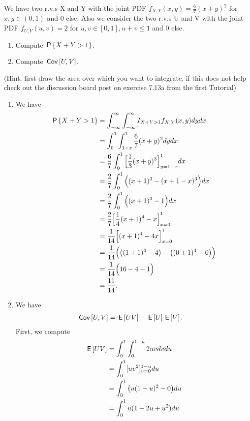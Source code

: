 \documentclass[assignments]{subfiles}
\begin{document}
\begin{exercise}
We have two r.v.s X and Y with the joint PDF $f_{X,Y}(x,y) = \frac{6}{7}(x+y)^2$ for $x, y \in (0,1)$ and 0 else. Also we consider the two r.v.s U and V with the joint PDF $f_{U,V}(u,v) = 2$ for $u, v \in [0,1], u+v \leq 1$ and 0 else.
\begin{enumerate}
\item Compute $\P{X+Y>1}$.
\item Compute $\cov{U,V}$.
\end{enumerate}
(Hint: first draw the area over which you want to integrate, if this does not help check out the discussion board post on exercise 7.13a from the first Tutorial)
\begin{solution}
\begin{enumerate}
    \item We have
    \begin{align}
        \P{X+Y>1} &= \int_{-\infty}^\infty \int_{-\infty}^\infty I_{X + Y > 1} f_{X,Y}(x,y) dy dx \\
        &= \int_{0}^1 \int_{1-x}^1  \frac{6}{7}(x+y)^2 dy dx \\
        &=\frac{6}{7} \int_{0}^1 \Big[\frac{1}{3} (x+y)^3 \Big]_{y=1-x}^1 dx \\
        &=\frac{2}{7} \int_{0}^1 \Big( (x+1)^3 - (x + 1 - x)^3 \Big) dx \\
        &=\frac{2}{7} \int_{0}^1 \Big( (x+1)^3 - 1 \Big) dx \\
        &=\frac{2}{7} \Big[ \frac{1}{4}(x+1)^4 - x \Big]_{x=0}^1 \\
        &=\frac{1}{14}\Big[ (x+1)^4 - 4x \Big]_{x=0}^1 \\
        &=\frac{1}{14} \Big( \big( (1+1)^4 - 4\big) - \big((0+1)^4 - 0 \big) \Big) \\
        &=\frac{1}{14} \Big( 16 - 4 - 1 \Big) \\
        &= \frac{11}{14}.
    \end{align}
    \item We have
    \begin{align}
        \cov{U,V} &= \E{UV} - \E{U}\E{V}.
    \end{align}
    First, we compute
    \begin{align}
        \E{UV} &= \int_0^1 \int_0^{1-u} 2 uv dv du \\
        &= \int_0^1 [uv^2]_{v=0}^{1-u} du \\
        &= \int_0^1 \big( u(1-u)^2 - 0\big) du \\
        &= \int_0^1 u(1 - 2u + u^2) du \\

\end{align}
\end{enumerate}
\end{solution}
\end{exercise}
\end{document}

